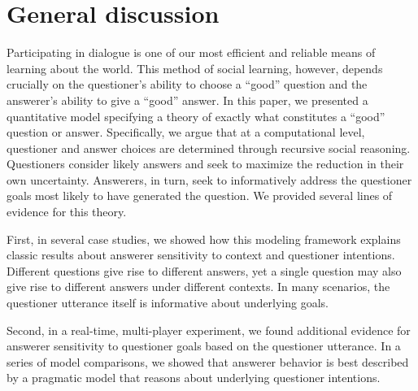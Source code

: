 \documentclass[12pt, floatsintext, jou]{apa6}
\begin{document}
\section{General discussion}
\label{sec:gd}


Participating in dialogue is one of our most efficient and reliable means of learning about the world. This method of social learning, however, depends crucially on the questioner's ability to choose a ``good'' question and the answerer's ability to give a ``good'' answer. In this paper, we presented a quantitative model specifying a theory of exactly what constitutes a ``good'' question or answer. Specifically, we argue that at a computational level, questioner and answer choices are determined through recursive social reasoning. Questioners consider likely answers and seek to maximize the reduction in their own uncertainty. Answerers, in turn, seek to informatively address the questioner goals most likely to have generated the question. We provided several lines of evidence for this theory. 

First, in several case studies, we showed how this modeling framework explains classic results about answerer sensitivity to context and questioner intentions. Different questions give rise to different answers, yet a single question may also give rise to different answers under different contexts.%
In many scenarios, the questioner utterance itself is informative about underlying goals. 


Second, in a real-time, multi-player experiment, we found additional evidence for answerer sensitivity to questioner goals based on the questioner utterance. In a series of model comparisons, we showed that answerer behavior is best described by a pragmatic model that reasons about underlying questioner intentions. %
\end{document}
